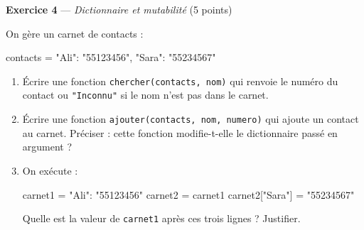 \bigskip

\textbf{Exercice 4} --- \textit{Dictionnaire et mutabilité} \hfill (5 points)

On gère un carnet de contacts :
\begin{python}
contacts = {"Ali": "55123456", "Sara": "55234567"}
\end{python}

\begin{enumerate}
  \item Écrire une fonction \lstinline{chercher(contacts, nom)} qui renvoie le numéro
        du contact ou \lstinline{"Inconnu"} si le nom n'est pas dans le carnet.
  \item Écrire une fonction \lstinline{ajouter(contacts, nom, numero)} qui ajoute un
        contact au carnet. Préciser : cette fonction modifie-t-elle le dictionnaire
        passé en argument ?
  \item On exécute :
\begin{python}
carnet1 = {"Ali": "55123456"}
carnet2 = carnet1
carnet2["Sara"] = "55234567"
\end{python}
        Quelle est la valeur de \lstinline{carnet1} après ces trois lignes ? Justifier.
\end{enumerate}

